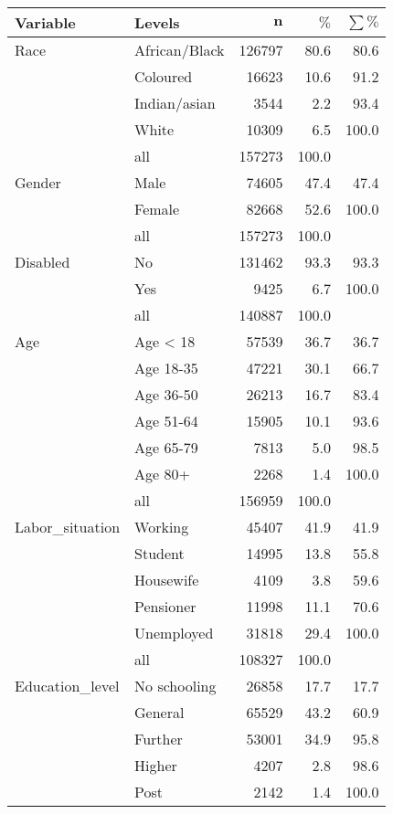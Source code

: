 \documentclass[]{article}
\begin{document}
\begin{longtable}{llrrr}
 \textbf{Variable} & \textbf{Levels} & $\mathbf{n}$ & $\mathbf{\%}$ & $\mathbf{\sum \%}$ \\ 
  \hline
Race & African/Black & 126797 & 80.6 & 80.6 \\ 
   & Coloured & 16623 & 10.6 & 91.2 \\ 
   & Indian/asian & 3544 & 2.2 & 93.4 \\ 
   & White & 10309 & 6.5 & 100.0 \\ 
   \hline
 & all & 157273 & 100.0 &  \\ 
   \hline
\hline
Gender & Male & 74605 & 47.4 & 47.4 \\ 
   & Female & 82668 & 52.6 & 100.0 \\ 
   \hline
 & all & 157273 & 100.0 &  \\ 
   \hline
\hline
Disabled & No & 131462 & 93.3 & 93.3 \\ 
   & Yes & 9425 & 6.7 & 100.0 \\ 
   \hline
 & all & 140887 & 100.0 &  \\ 
   \hline
\hline
Age & Age < 18 & 57539 & 36.7 & 36.7 \\ 
   & Age 18-35 & 47221 & 30.1 & 66.7 \\ 
   & Age 36-50 & 26213 & 16.7 & 83.4 \\ 
   & Age 51-64 & 15905 & 10.1 & 93.6 \\ 
   & Age 65-79 & 7813 & 5.0 & 98.5 \\ 
   & Age 80+ & 2268 & 1.4 & 100.0 \\ 
   \hline
 & all & 156959 & 100.0 &  \\ 
   \hline
\hline
Labor\_situation & Working & 45407 & 41.9 & 41.9 \\ 
   & Student & 14995 & 13.8 & 55.8 \\ 
   & Housewife & 4109 & 3.8 & 59.6 \\ 
   & Pensioner & 11998 & 11.1 & 70.6 \\ 
   & Unemployed & 31818 & 29.4 & 100.0 \\ 
   \hline
 & all & 108327 & 100.0 &  \\ 
   \hline
\hline
Education\_level & No schooling & 26858 & 17.7 & 17.7 \\ 
   & General & 65529 & 43.2 & 60.9 \\ 
   & Further & 53001 & 34.9 & 95.8 \\ 
   & Higher & 4207 & 2.8 & 98.6 \\ 
   & Post & 2142 & 1.4 & 100.0 \\ 

\end{longtable}
\end{document}
